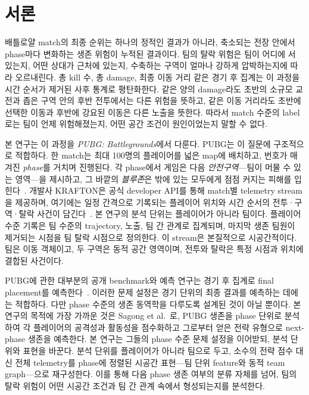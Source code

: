 \section{서론}

배틀로얄 match의 최종 순위는 하나의 정적인 결과가 아니라, 축소되는 전장
안에서 phase마다 변화하는 생존 위험이 누적된 결과이다. 팀의 탈락 위험은
팀이 어디에 서 있는지, 어떤 상대가 근처에 있는지, 수축하는 구역이 얼마나
강하게 압박하는지에 따라 오르내린다. 총 kill 수, 총 damage, 최종 이동 거리
같은 경기 후 집계는 이 과정을 시간 순서가 제거된 사후 통계로 평탄화한다.
같은 양의 damage라도 초반의 소규모 교전과 좁은 구역 안의 후반 전투에서는
다른 위험을 뜻하고, 같은 이동 거리라도 초반에 선택한 이동과 후반에 강요된
이동은 다른 노출을 뜻한다. 따라서 match 수준의 label로는 팀이 언제
위험해졌는지, 어떤 공간 조건이 원인이었는지 말할 수 없다.

본 연구는 이 과정을 \textit{PUBG: Battlegrounds}에서 다룬다. PUBG는 이
질문에 구조적으로 적합하다. 한 match는 최대 100명의 플레이어를 넓은 map에
배치하고, 번호가 매겨진 \textit{phase}를 거치며 진행된다. 각 phase에서
게임은 다음 \textit{안전구역}---팀이 머물 수 있는 영역---을 제시하고, 그
바깥의 \textit{블루존}은 밖에 있는 모두에게 점점 커지는 피해를
입힌다~\cite{pubgGameInfo}. 개발사 KRAFTON은 공식 developer API를 통해
match별 telemetry stream을 제공하며, 여기에는 일정 간격으로 기록되는
플레이어 위치와 시간 순서의 전투·구역·탈락 사건이
담긴다~\cite{pubgTelemetryEvents}. 본 연구의 분석 단위는 플레이어가 아니라
팀이다. 플레이어 수준 기록은 팀 수준의 trajectory, 노출, 팀 간 관계로
집계되며, 마지막 생존 팀원이 제거되는 시점을 팀 탈락 시점으로 정의한다.
이 stream은 본질적으로 시공간적이다. 팀은 이동 객체이고, 두 구역은 동적
공간 영역이며, 전투와 탈락은 특정 시점과 위치에 결합된 사건이다.

PUBG에 관한 대부분의 공개 benchmark와 예측 연구는 경기 후 집계로 final
placement를 예측한다~\cite{kagglePubgFinishPlacement,sen2021pubgFinalRank,lee2025pubgRank}.
이러한 문제 설정은 경기 단위의 최종 결과를 예측하는 데에는 적합하다. 다만
phase 수준의 생존 동역학을 다루도록 설계된 것이 아닐 뿐이다. 본 연구의
목적에 가장 가까운 것은 Sagong et al.~\cite{sagong2025hunterCamper}로,
PUBG 생존을 phase 단위로 분석하여 각 플레이어의 공격성과 활동성을
점수화하고 그로부터 얻은 전략 유형으로 next-phase 생존을 예측한다. 본
연구는 그들의 phase 수준 문제 설정을 이어받되, 분석 단위와 표현을 바꾼다.
분석 단위를 플레이어가 아니라 팀으로 두고, 소수의 전략 점수 대신 전체
telemetry를 phase에 정렬된 시공간 표현---팀 단위 feature와 동적 team
graph---으로 재구성한다. 이를 통해 다음 phase 생존 여부의 분류 자체를
넘어, 팀의 탈락 위험이 어떤 시공간 조건과 팀 간 관계 속에서 형성되는지를
분석한다.


